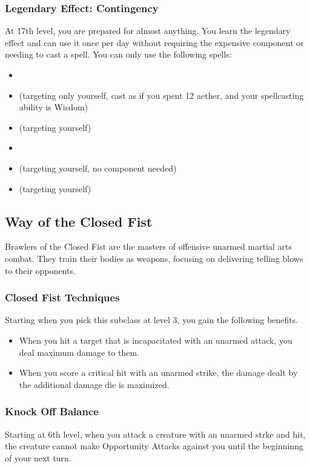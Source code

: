 \subsubsection{Legendary Effect: Contingency}
At 17th level, you are prepared for almost anything. You learn the legendary effect  and can use it once per day without requiring the expensive component or needing to cast a spell. You can only use the following spells:
\begin{itemize}
	\item {}
	\item {} (targeting only yourself, cast as if you spent 12 aether, and your spellcasting ability is Wisdom)
	\item {} (targeting yourself)
	\item {}
	\item {} (targeting yourself, no component needed)
	\item {} (targeting yourself)
\end{itemize}

\subsection{Way of the Closed Fist}
Brawlers of the Closed Fist are the masters of offensive unarmed martial arts combat. They train their bodies as weapons, focusing on delivering telling blows to their opponents.

\subsubsection{Closed Fist Techniques}
Starting when you pick this subclass at level 3, you gain the following benefits.
\begin{itemize}
	\item When you hit a target that is incapacitated with an unarmed attack, you deal maximum damage to them.
	\item When you score a critical hit with an unarmed strike, the damage dealt by the additional damage die is maximized.
\end{itemize}

\subsubsection{Knock Off Balance}
Starting at 6th level, when you attack a creature with an unarmed strke and hit, the creature cannot make Opportunity Attacks against you until the beginninng of your next turn.

